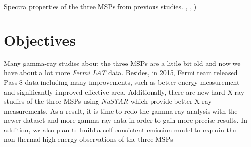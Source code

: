 \documentclass[12pt]{report}
\newcommand{\mycaption}[1]{\protect \caption{#1}}
\begin{document}
    \begin{table}[!htp]
      \centering
      \vspace{0.5cm}
        \centering
        \mycaption{Spectra properties of the three MSPs from previous studies. 
          \citep{ATNF}, \citep{0004-637X-787-2-167}, \citep{J1939_old})}
        \label{table: previous_spectra_property}
    \end{table}

  \section{Objectives}
    
    
    Many gamma-ray studies about the three MSPs are a little bit old and now we have about 
    a lot more \textit{Fermi LAT} data. Besides, in 2015, Fermi team released Pass 8 data 
    including many improvements, such as better energy measurement and significantly 
    improved effective area. Additionally, there are new hard X-ray studies of the three 
    MSPs using \textit{NuSTAR} which provide better X-ray measurements.
    As a result, it is time to redo the gamma-ray analysis with the newer dataset and
    more gamma-ray data in order to gain more precise results. In addition, we also plan to 
    build a self-consistent emission model to explain the non-thermal high energy
    observations of the three MSPs. 
\end{document}
